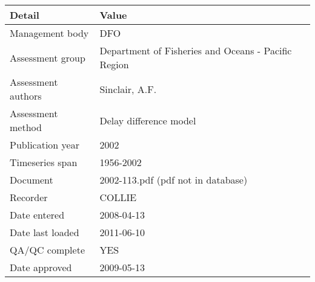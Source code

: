 \begin{table}[htb]
\centering
\begin{tabular}{lp{7cm}}
\toprule
Detail & Value \\
\midrule
Management body    & DFO                                                 \\
Assessment group   & Department of Fisheries and Oceans - Pacific Region \\
Assessment authors & Sinclair, A.F.                                      \\
Assessment method  & Delay difference model                              \\
Publication year   & 2002                                                \\
Timeseries span    & 1956-2002                                           \\
Document           & 2002-113.pdf (pdf not in database)                  \\
Recorder           & COLLIE                                              \\
Date entered       & 2008-04-13                                          \\
Date last loaded   & 2011-06-10                                          \\
QA/QC complete     & YES                                                 \\
Date approved      & 2009-05-13                                          \\
\bottomrule
\end{tabular}
\label{tab:assessdet}
\end{table}
